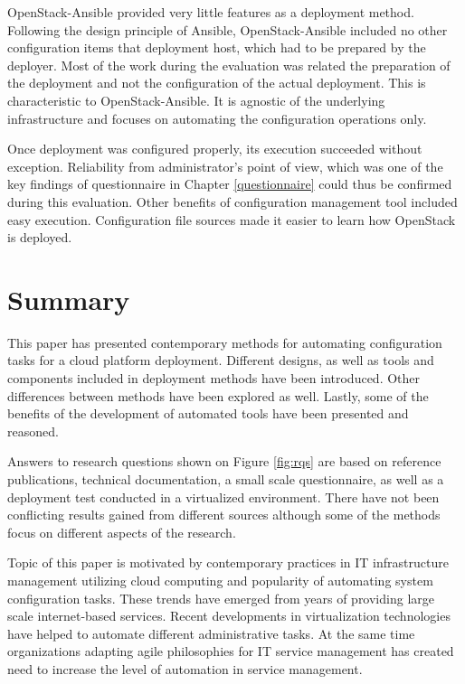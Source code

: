 OpenStack-Ansible provided very little features as a deployment method.
Following the design principle of Ansible, OpenStack-Ansible included no other
configuration items that deployment host, which had to be prepared by the
deployer. Most of the work during the evaluation was related the preparation of
the deployment and not the configuration of the actual deployment. This is
characteristic to OpenStack-Ansible. It is agnostic of the underlying
infrastructure and focuses on automating the configuration operations only.

Once deployment was configured properly, its execution succeeded without
exception. Reliability from administrator's point of view, which was one of the
key findings of questionnaire in Chapter \ref{questionnaire} could thus be
confirmed during this evaluation. Other benefits of configuration management
tool included easy execution. Configuration file sources made it easier to
learn how OpenStack is deployed.

\chapter{Summary}

This paper has presented contemporary methods for automating configuration
tasks for a cloud platform deployment. Different designs, as well as tools and
components included in deployment methods have been introduced. Other
differences between methods have been explored as well. Lastly, some of the
benefits of the development of automated tools have been presented and
reasoned.

Answers to research questions shown on Figure \ref{fig:rqs} are based on
reference publications, technical documentation, a small scale questionnaire,
as well as a deployment test conducted in a virtualized environment. There have
not been conflicting results gained from different sources although some of the
methods focus on different aspects of the research.

Topic of this paper is motivated by contemporary practices in IT infrastructure
management utilizing cloud computing and popularity of automating system
configuration tasks. These trends have emerged from years of providing
large scale internet-based services. Recent developments in virtualization
technologies have helped to automate different administrative tasks. At the
same time organizations adapting agile philosophies for IT service management
has created need to increase the level of automation in service management.

